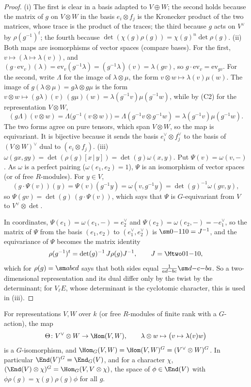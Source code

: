 \begin{proof}
(i) The first is clear in a basis adapted to $V\oplus W$; the second holds because the matrix of $g$ on $V\otimes W$ in the basis
$e_i\otimes f_j$ is the Kronecker product of the two matrices, whose trace is the product of the traces; the third because $g$ acts on
$V^\vee$ by $\rho(g^{-1})^t$; the fourth because $\det(\chi(g)\rho(g))=\chi(g)^n\det\rho(g)$.
(ii) Both maps are isomorphisms of vector spaces (compare bases). For the first, $v\mapsto(\lambda\mapsto\lambda(v))$, and
$(g\cdot\mathrm{ev}_v)(\lambda)=\mathrm{ev}_v(g^{-1}\lambda)=(g^{-1}\lambda)(v)=\lambda(gv)$, so $g\cdot\mathrm{ev}_v=\mathrm{ev}_{gv}$. For the second, write $\Lambda$ for the image of $\lambda\otimes\mu$, the form
$v\otimes w\mapsto\lambda(v)\mu(w)$. The image of $g(\lambda\otimes\mu)=g\lambda\otimes g\mu$ is the form $v\otimes w\mapsto(g\lambda)(v)\,(g\mu)(w)=\lambda(g^{-1}v)\mu(g^{-1}w)$,
while by (C2) for the representation $V\otimes W$,
\[
(g\Lambda)(v\otimes w)=\Lambda\bigl(g^{-1}(v\otimes w)\bigr)=\Lambda(g^{-1}v\otimes g^{-1}w)=\lambda(g^{-1}v)\mu(g^{-1}w).
\]
The two forms agree on pure tensors, which span $V\otimes W$, so the map is equivariant. It is bijective because it sends the basis
$e_i^\vee\otimes f_j^\vee$ to the basis of $(V\otimes W)^\vee$ dual to $(e_i\otimes f_j)$.
(iii) $\omega(gx,gy)=\det(\rho(g)[x\,|\,y])=\det(g)\omega(x,y)$. Put $\Psi(v)=\omega(v,{-})$. As $\omega$ is a perfect pairing ($\omega(e_1,e_2)=1$),
$\Psi$ is an isomorphism of vector spaces (or of free $R$-modules). For $y\in V$,
\[
(g\cdot\Psi(v))(y)=\Psi(v)(g^{-1}y)=\omega(v,g^{-1}y)=\det(g)^{-1}\omega(gv,y),
\]
so $\Psi(gv)=\det(g)\,(g\cdot\Psi(v))$, which says that $\Psi$ is $G$-equivariant from $V$ to $V^\vee\otimes\det$.

In coordinates, $\Psi(e_1)=\omega(e_1,{-})=e_2^\vee$ and $\Psi(e_2)=\omega(e_2,{-})=-e_1^\vee$, so the matrix of $\Psi$ from the basis $(e_1,e_2)$ to
$(e_1^\vee,e_2^\vee)$ is $\sm0{-1}10=J^{-1}$, and the equivariance of $\Psi$ becomes the matrix identity
\[
\rho(g^{-1})^t=\det(g)^{-1}\,J\rho(g)J^{-1},\qquad J=\Mtwo01{-1}0,
\]
which for $\rho(g)=\sm abcd$ says that both sides equal $\frac1{ad-bc}\sm d{-c}{-b}a$. So a two-dimensional representation and its dual
differ only by the twist by the determinant; for $V_\ell E$, whose determinant is the cyclotomic character, this is used in
(iii).
\end{proof}

\begin{proposition}\label{prop:reps:homG}
For representations $V,W$ over $k$ (or free $R$-modules of finite rank with a $G$-action), the map
\[
\Theta\colon V^\vee\otimes W\to\Hom(V,W),\qquad \lambda\otimes w\mapsto\bigl(v\mapsto\lambda(v)w\bigr)
\]
is a $G$-isomorphism, and $\Hom_G(V,W)=\Hom(V,W)^G=(V^\vee\otimes W)^G$. In particular $\End(V)^G=\End_G(V)$, and for a character $\chi$,
$(\End(V)\otimes\chi)^G=\Hom_G(V,V\otimes\chi)$, the space of $\phi\in\End(V)$ with $\phi\rho(g)=\chi(g)\rho(g)\phi$ for all $g$.
\end{proposition}

